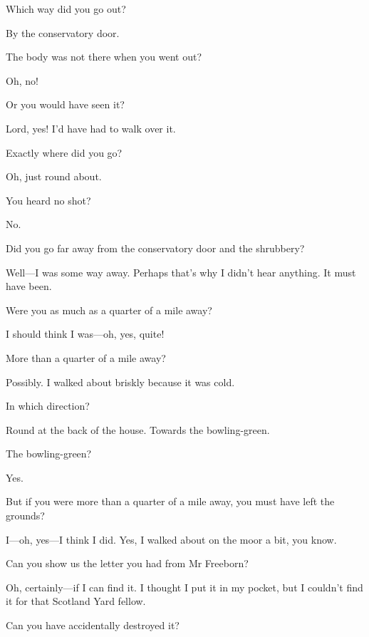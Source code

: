 \begin{dialogue}
 Which way did you go out?

 By the conservatory door.

 The body was not there when you went out?

 Oh, no!

 Or you would have seen it?

 Lord, yes! I'd have had to walk over it.

 Exactly where did you go?

  Oh, just round about.

 You heard no shot?

 No.

 Did you go far away from the conservatory door and the shrubbery?

 Well—I was some way away. Perhaps that's why I didn't hear anything. It must have been.

 Were you as much as a quarter of a mile away?

 I should think I was—oh, yes, quite!

 More than a quarter of a mile away?

 Possibly. I walked about briskly because it was cold.

 In which direction?

  Round at the back of the house.  Towards the bowling-green.

 The bowling-green?

  Yes.

 But if you were more than a quarter of a mile away, you must have left the grounds?

 I—oh, yes—I think I did. Yes, I walked about on the moor a bit, you know.

 Can you show us the letter you had from Mr Freeborn?

 Oh, certainly—if I can find it. I thought I put it in my pocket, but I couldn't find it for that Scotland Yard fellow.

 Can you have accidentally destroyed it?


\end{dialogue}
